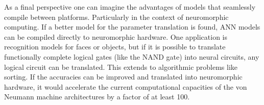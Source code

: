\documentclass[report.tex]{subfiles}
\begin{document}
As a final perspective one can imagine the advantages of models that seamlessly
compile between platforms. 
Particularly in the context of neuromorphic computing.
If a better model for the parameter translation is found, \gls{ANN} models can
be compiled directly to neuromorphic hardware.
One application is recognition models for faces or objects, but if it is
possible to translate functionally complete logical gates (like the NAND gate)
into neural circuits, any logical circuit can be translated.
This extends to algorithmic problems like sorting.
If the accuracies can be improved and translated into neuromorphic hardware, it
would accelerate the current computational capacities of the von Neumann machine
architectures by a factor of at least 100.
\\[0.1cm]

\FloatBarrier
\end{document}
